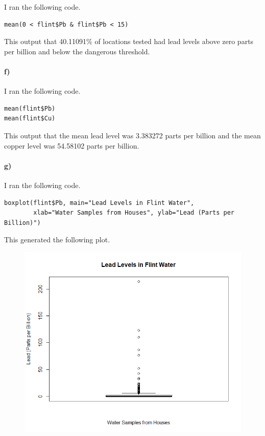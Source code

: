 \documentclass[12pt]{article}
\begin{document}
I ran the following code.
\begin{verbatim}
mean(0 < flint$Pb & flint$Pb < 15)
\end{verbatim}
This output that 40.11091\% of locations tested had lead levels above zero parts per
billion and below the dangerous threshold.

\paragraph{f)}

I ran the following code.
\begin{verbatim}
mean(flint$Pb)
mean(flint$Cu)
\end{verbatim}
This output that the mean lead level was 3.383272 parts per billion and the mean copper
level was 54.58102 parts per billion.

\paragraph{g)}

I ran the following code.
\scriptsize
\begin{verbatim}
boxplot(flint$Pb, main="Lead Levels in Flint Water",
        xlab="Water Samples from Houses", ylab="Lead (Parts per Billion)")
\end{verbatim}
\normalsize
This generated the following plot.
\begin{figure}[H]
    \begin{center}
        \includegraphics[width=4.5in]{exercise1g.png}
    \end{center}
\end{figure}
\end{document}
